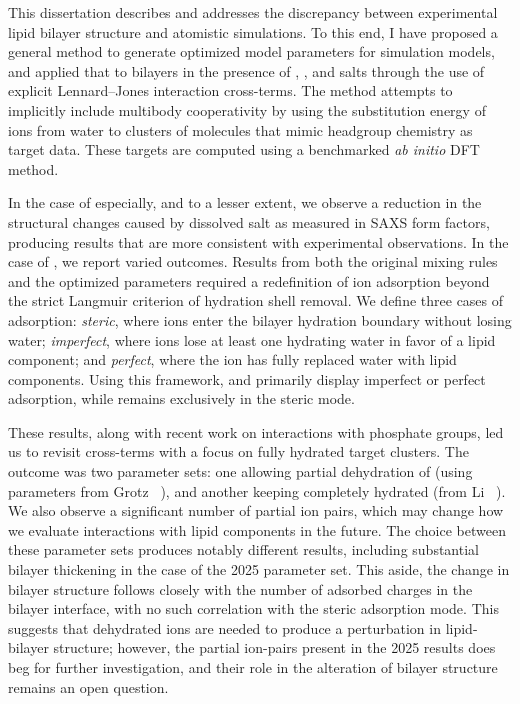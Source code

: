 This dissertation describes and addresses the discrepancy between
experimental lipid bilayer structure and atomistic simulations. To
this end, I have proposed a general method to generate optimized
model parameters for simulation models, and applied that to bilayers
in the presence of \nacl{}, \licl{}, and \mgcl{} salts through the
use of explicit Lennard–Jones interaction cross-terms. The method
attempts to implicitly include multibody cooperativity by using the
substitution energy of ions from water to clusters of molecules that
mimic headgroup chemistry as target data. These targets are computed
using a benchmarked \emph{ab initio} DFT method.

In the case of \nacl{} especially, and \licl{} to a lesser extent, we
observe a reduction in the structural changes caused by dissolved
salt as measured in SAXS form factors, producing results that are
more consistent with experimental observations. In the case of
\mgcl{}, we report varied outcomes. Results from both the original
mixing rules and the optimized parameters required a redefinition of
ion adsorption beyond the strict Langmuir criterion of hydration
shell removal. We define three cases of adsorption: \emph{steric},
where ions enter the bilayer hydration boundary without losing water;
\emph{imperfect}, where ions lose at least one hydrating water in
favor of a lipid component; and \emph{perfect}, where the ion has
fully replaced water with lipid components. Using this framework,
\na{} and \li{} primarily display imperfect or perfect adsorption,
while \mg{} remains exclusively in the steric mode.

These results, along with recent work on \mg{} interactions with
phosphate groups, led us to revisit \mg{} cross-terms with a focus on
fully hydrated target clusters. The outcome was two parameter sets:
one allowing partial dehydration of \mg{} (using parameters from
Grotz \etal{}~\cite{grotzparams}), and another keeping \mg{}
completely hydrated (from Li \etal{}~\cite{merzhfe}). We also observe
a significant number of partial ion pairs, which may change how we
evaluate \cl{} interactions with lipid components in the future. The
choice between these parameter sets produces notably different
results, including substantial bilayer thickening in the case of the
2025 parameter set. This aside, the change in bilayer structure follows 
closely with the number of adsorbed charges in the bilayer interface, with 
no such correlation with the steric adsorption mode. This suggests that dehydrated ions are needed 
to produce a perturbation in lipid-bilayer structure; however, the partial ion-pairs present in the 2025 results 
does beg for further investigation, and their role in the alteration of bilayer structure remains an open question.

